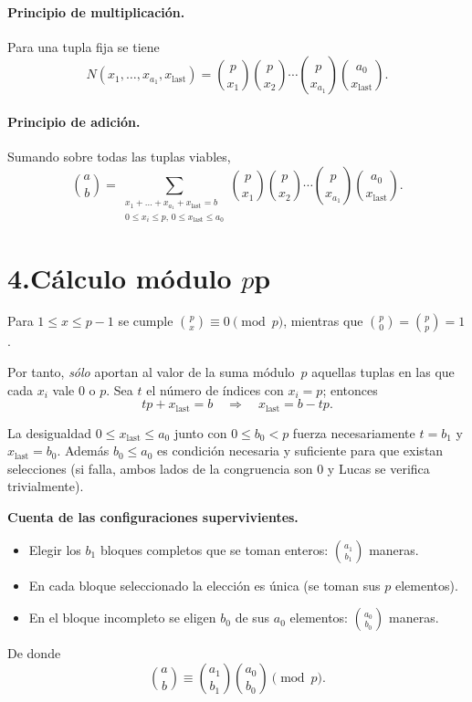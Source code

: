 \documentclass{article}
\begin{document}
\paragraph{Principio de multiplicación.}
Para una tupla fija se tiene
\[
  N(x_1,\dots,x_{a_1},x_{\text{last}})
  = \binom{p}{x_1}\binom{p}{x_2}\cdots\binom{p}{x_{a_1}}
    \binom{a_0}{x_{\text{last}}}.
\]

\paragraph{Principio de adición.}
Sumando sobre todas las tuplas viables,
\[
  \binom{a}{b}
  =\!\!\!
    \sum_{\substack{x_1+\dots+x_{a_1}+x_{\text{last}}=b\\
                    0\le x_i\le p,\,0\le x_{\text{last}}\le a_0}}
      \binom{p}{x_1}\binom{p}{x_2}\cdots\binom{p}{x_{a_1}}
      \binom{a_0}{x_{\text{last}}}.
\]

\section*{4.\;Cálculo módulo {$p$}{p}}

Para $1\le x\le p-1$ se cumple
$\displaystyle\binom{p}{x}\equiv 0\pmod{p}$,
mientras que
$\binom{p}{0}=\binom{p}{p}=1$.

Por tanto, \emph{sólo} aportan al valor de la suma módulo $p$
aquellas tuplas en las que cada $x_i$ vale $0$ o $p$.
Sea $t$ el número de índices con $x_i=p$; entonces
\[
  tp + x_{\text{last}} = b \quad\Longrightarrow\quad
  x_{\text{last}} = b-tp.
\]

La desigualdad $0\le x_{\text{last}}\le a_0$
junto con $0\le b_0 <p$ fuerza necesariamente
$t=b_1$ y $x_{\text{last}}=b_0$.
Además $b_0\le a_0$ es condición necesaria y suficiente
para que existan selecciones (si falla, ambos lados de la congruencia
son $0$ y Lucas se verifica trivialmente).

\medskip
\noindent
\textbf{Cuenta de las configuraciones supervivientes.}
\begin{itemize}
  \item Elegir los $b_1$ bloques completos que se toman enteros:
        $\binom{a_1}{b_1}$ maneras.
  \item En cada bloque seleccionado la elección es única
        (se toman sus $p$ elementos).
  \item En el bloque incompleto se eligen $b_0$ de sus $a_0$ elementos:
        $\binom{a_0}{b_0}$ maneras.
\end{itemize}
De donde
\[
  \binom{a}{b}\equiv \binom{a_1}{b_1}\binom{a_0}{b_0}\pmod{p}.
\]
\end{document}
